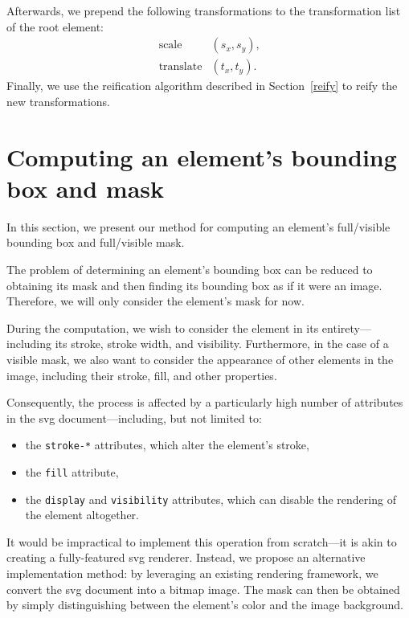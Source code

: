 Afterwards, we prepend the following transformations to the transformation list of the root element:
\begin{align}
    \operatorname{scale}&\left(s_x, s_y\right)\text{,} \\
    \operatorname{translate}&\left(t_x, t_y\right)\text{.}
\end{align}
Finally, we use the reification algorithm described in Section~\ref{reify} to reify the new transformations.

\section{Computing an element's bounding box and mask}\label{impl:bbox-mask}

In this section, we present our method for computing an element's full\slash visible bounding box and full\slash visible mask.

The problem of determining an element's bounding box can be reduced to obtaining its mask and then finding its bounding box as if it were an image. Therefore, we will only consider the element's mask for now.

During the computation, we wish to consider the element in its entirety---including its stroke, stroke width, and visibility. Furthermore, in the case of a visible mask, we also want to consider the appearance of other elements in the image, including their stroke, fill, and other properties.

Consequently, the process is affected by a particularly high number of attributes in the \gls{svg} document---including, but not limited to:
\begin{itemize}
    \item the \texttt{stroke-*} attributes, which alter the element's stroke,
    \item the \texttt{fill} attribute,
    \item the \texttt{display} and \texttt{visibility} attributes, which can disable the rendering of the element altogether.
\end{itemize}

It would be impractical to implement this operation from scratch---it is akin to creating a fully-featured \gls{svg} renderer. Instead, we propose an alternative implementation method: by leveraging an existing rendering framework, we convert the \gls{svg} document into a bitmap image. The mask can then be obtained by simply distinguishing between the element's color and the image background.

